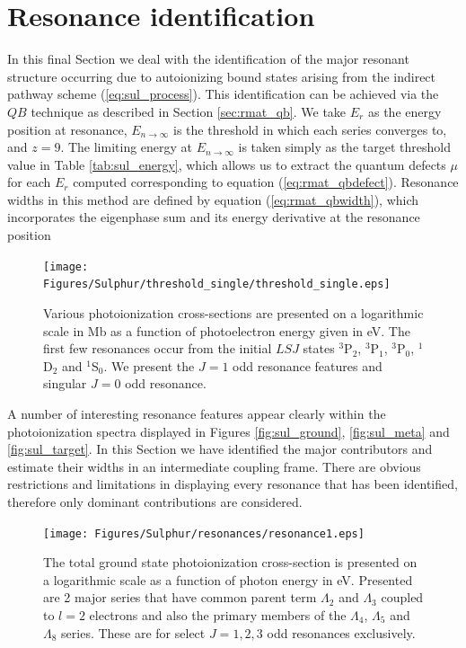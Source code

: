 
\section{Resonance identification}
In this final Section we deal with the identification of the major resonant structure occurring due to autoionizing bound states arising from the indirect pathway scheme (\ref{eq:sul_process}). This identification can be achieved via the $QB$ technique as described in Section \ref{sec:rmat_qb}. We take $E_r$ as the energy position at resonance, $E_{n\rightarrow\infty}$ is the threshold in which each series converges to, and $z=9$. The limiting energy at $E_{n\rightarrow\infty}$ is taken simply as the target threshold value in Table \ref{tab:sul_energy}, which allows us to extract the quantum defects $\mu$ for each $E_r$ computed corresponding to equation (\ref{eq:rmat_qbdefect}). Resonance widths in this method are defined by equation (\ref{eq:rmat_qbwidth}), which incorporates the eigenphase sum and its energy derivative at the resonance position

%
\begin{figure}[hbt]
\texttt{[image: Figures/Sulphur/threshold\_single/threshold\_single.eps]}
\caption{Various photoionization cross-sections are presented on a logarithmic scale in Mb as a function of photoelectron energy given in eV. The first few resonances occur from the initial $LSJ$ states $^3$P$_2$, $^3$P$_1$, $^3$P$_0$, $^1$D$_2$ and $^1$S$_0$. We present the $J = 1$ odd resonance features and singular $J = 0$ odd resonance. \label{fig:sul_thresh}}
\end{figure}
%

A number of interesting resonance features appear clearly within the photoionization spectra displayed in Figures \ref{fig:sul_ground}, \ref{fig:sul_meta} and \ref{fig:sul_target}. In this Section we have identified the major contributors and estimate their widths in an intermediate coupling frame. There are obvious restrictions and limitations in displaying every resonance that has been identified, therefore only dominant contributions are considered.

%
\begin{figure}
\centering
\texttt{[image: Figures/Sulphur/resonances/resonance1.eps]}
\caption{The total ground state photoionization cross-section is presented on a logarithmic scale as a function of photon energy in eV. Presented are 2 major series that have common parent term $\Lambda_2$ and $\Lambda_3$ coupled to $l=2$ electrons and also the primary members of the $\Lambda_4$, $\Lambda_5$ and $\Lambda_8$ series. These are for select $J =1,2,3$ odd resonances exclusively. \label{fig:sul_resonances1}}
\end{figure}
%

